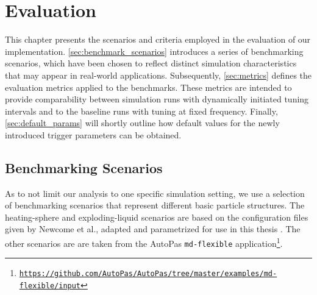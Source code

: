 \chapter[Evaluation]{Evaluation}
\label{cp:evaluation}

{
	\parindent0pt
	This chapter presents the scenarios and criteria employed in the evaluation of our implementation. \autoref{sec:benchmark_scenarios} introduces a series of benchmarking scenarios, which have been chosen to reflect distinct simulation characteristics that may appear in real-world applications. Subsequently, \autoref{sec:metrics} defines the evaluation metrics applied to the benchmarks. These metrics are intended to provide comparability between simulation runs with dynamically initiated tuning intervals and to the baseline runs with tuning at fixed frequency.
	Finally, \autoref{sec:default_params} will shortly outline how default values for the newly introduced trigger parameters can be obtained.
}


\section{Benchmarking Scenarios}
\label{sec:benchmark_scenarios}
As to not limit our analysis to one specific simulation setting, we use a selection of benchmarking scenarios that represent different basic particle structures.
The heating-sphere and exploding-liquid scenarios are based on the configuration files given by Newcome et al., adapted and parametrized for use in this thesis \cite{Newcome2025}.
The other scenarios are are taken from the AutoPas \texttt{md-flexible} application\footnote{\href{https://github.com/AutoPas/AutoPas/tree/master/examples/md-flexible/input}{\texttt{https://github.com/AutoPas/AutoPas/tree/master/examples/md-flexible/input}}}.



\newcommand{\fastcolorbar}{%
	\centering
	\begin{tikzpicture}
		\pgfplotscolorbardrawstandalone[
			colorbar,
			colormap name=fast,
			point meta min=0,
			point meta max=50,
			colorbar style={
					height=3cm,
					ytick={0,10,...,50},
					tick align=outside,
					tick pos=right,
				},
		]
	\end{tikzpicture}

	\begin{tikzpicture}
		\node[anchor=north, align=center] at (0,0) {\si{F^{*}}};
	\end{tikzpicture}
}

